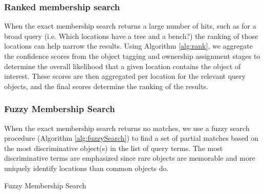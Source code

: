 \subsubsection{\textbf{Ranked membership search}}
When the exact membership search returns a large number of hits, such as for a broad query (i.e. Which locations have a tree and a bench?) the ranking of those locations can help narrow the results. Using Algorithm \ref{alg:rank}, we aggregate the confidence scores from the object tagging and ownership assignment stages to determine the overall likelihood that a given location contains the object of interest. These scores are then aggregated per location for the relevant query objects, and the final scores determine the ranking of the results. 




\subsubsection{\textbf{Fuzzy Membership Search}}
When the exact membership search returns no matches, we use a fuzzy search procedure (Algorithm \ref{alg:fuzzySearch}) to find a set of partial matches based on the most discriminative object(s) in the list of query terms. 
The most discriminative terms are emphasized since rare objects are memorable and more uniquely identify locations than common objects do.

\begin{algorithm}
    \caption{Fuzzy Membership Search}\label{alg:fuzzySearch}
    \begin{algorithmic}[2]
        \State{- - - - -}
                \Else
                \EndIf
            \EndIf
            \EndIf
        \EndProcedure
    \end{algorithmic}
\end{algorithm}
\normalsize

